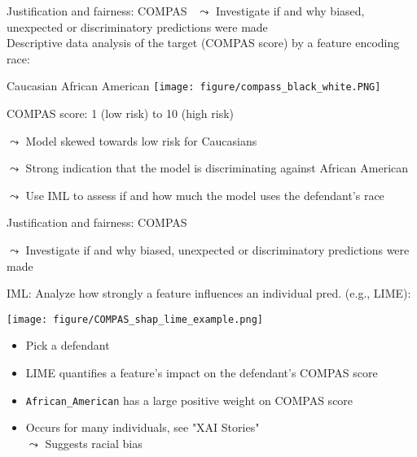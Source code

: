 \documentclass[10pt,compress,t,notes=noshow, xcolor=table]{beamer}
\begin{document}
\begin{frame}{Justification and fairness: COMPAS~}
    $\leadsto$ Investigate if and why biased, unexpected or discriminatory predictions were made \\
    \medskip
    Descriptive data analysis of the target (COMPAS score) by a feature encoding race: 

    \medskip
    \centering
    
    \hspace{20pt} Caucasian \hspace{100pt}
 African American
    \texttt{[image: figure/compass\_black\_white.PNG]}

    COMPAS score: 1 (low risk) to 10 (high risk)

    \medskip
    \raggedright
	$\leadsto$ Model skewed towards low risk for Caucasians
	
	$\leadsto$ Strong indication that the model is discriminating against African American
	
	$\leadsto$ Use IML to assess if and how much the model uses the defendant's race
\end{frame}

\begin{frame}{Justification and fairness: COMPAS }

    $\leadsto$ Investigate if and why biased, unexpected or discriminatory predictions were made 

\medskip

    IML: Analyze how strongly a feature influences an individual pred. (e.g., LIME):

    \medskip
    \centering
    \begin{splitVCC}[0.45]{
    \texttt{[image: figure/COMPAS\_shap\_lime\_example.png]}
    
    }
    {
    \begin{itemize}
        \item Pick a defendant
        \item LIME quantifies a feature's impact on the defendant's COMPAS score
        \item \texttt{African\_American} has a large positive weight on COMPAS score
        \item Occurs for many individuals, see
        "XAI Stories" \\
        $\leadsto$ Suggests racial bias
    \end{itemize}
    }
    \end{splitVCC}
\end{frame}
\end{document}
